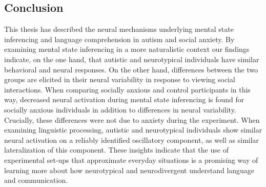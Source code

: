 \subsection*{Conclusion}

This thesis has described the neural mechanisms underlying mental state inferencing and language comprehension in autism and social anxiety. By examining mental state inferencing in a more naturalistic context our findings indicate, on the one hand, that autistic and neurotypical individuals have similar behavioral and neural responses. On the other hand, differences between the two groups are elicited in their neural variability in response to viewing social interactions. When comparing socially anxious and control participants in this way, decreased neural activation during mental state inferencing is found for socially anxious individuals in addition to differences in neural variability. Crucially, these differences were not due to anxiety during the experiment. When examining linguistic processing, autistic and neurotypical individuals show similar neural activation on a reliably identified oscillatory component, as well as similar lateralization of this component. These insights indicate that the use of experimental set-ups that approximate everyday situations is a promising way of learning more about how neurotypical and neurodivergent understand language and communication. 